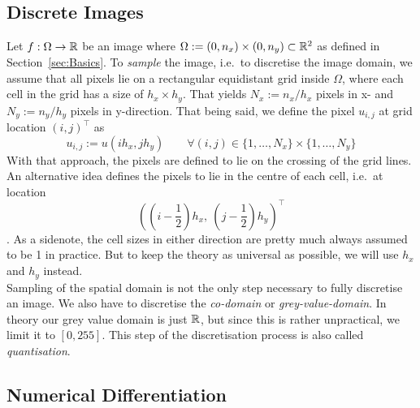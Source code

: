 \subsection{Discrete Images}\label{sub:DiscreteImages}
Let $f:\Omega \rightarrow \mathbb{R}$ be an image where $\Omega
:= (0, n_x)\times(0, n_y) \subset \mathbb{R}^2$ as defined in Section~\ref{sec:Basics}. To
\textit{sample} the image, i.e.\ to discretise the image domain, we assume that all pixels lie on a
rectangular equidistant grid inside $\Omega$, where each cell in the grid has a size of $h_x
\times h_y$.
That yields $N_x := n_x/h_x$ pixels in x- and $N_y := n_y/h_y$ pixels in
y-direction.
That being said, we define the pixel $u_{i,j}$ at grid location ${(i, j)}^\top$ as
\begin{equation}
    u_{i, j} := u(ih_x, jh_y)\qquad \forall(i ,j) \in \{1,\dots,N_x\}\times\{1,\dots,N_y\}
\end{equation}
With that approach, the pixels are defined to lie on the crossing of the grid lines.
An alternative idea defines the pixels to lie in the centre of each cell, i.e.\ at location 
\begin{equation}
    {\left(\left(i-\frac{1}{2}\right)h_x,\ \left(j- \frac{1}{2}\right)h_y\right)}^\top
\end{equation}.
As a sidenote, the cell sizes in either direction are pretty much always assumed to be 1 in 
practice. 
But to keep the theory as universal as possible, we will use $h_x$ and $h_y$ instead.\\
Sampling of the spatial domain is not the only step necessary to fully discretise an image. We also have
to discretise the \textit{co-domain} or \textit{grey-value-domain}. In theory our grey value domain
is just $\mathbb{R}$, but since this is rather unpractical, we limit it to $[0, 255]$. This step of
the discretisation process is also called \textit{quantisation}.

\subsection{Numerical Differentiation}\label{sub:NumDiff}

